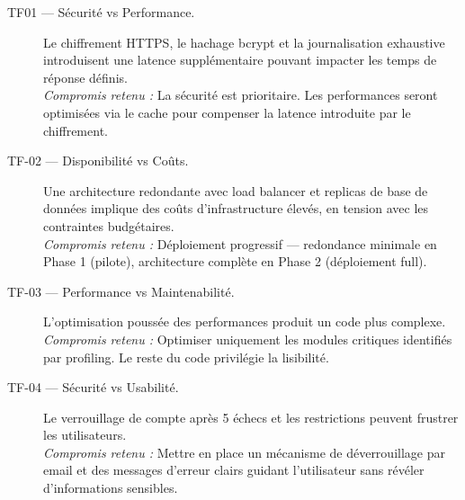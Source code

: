 \begin{description}

    \item[TF01 — Sécurité vs Performance.]
    Le chiffrement HTTPS, le hachage bcrypt et la journalisation exhaustive
    introduisent une latence supplémentaire pouvant impacter les temps de
    réponse définis.\\
    \textit{Compromis retenu :} La sécurité est prioritaire. Les performances
    seront optimisées via le cache pour compenser la latence
    introduite par le chiffrement.

    \item[TF-02 — Disponibilité vs Coûts.]
    Une architecture redondante  avec load balancer et replicas
    de base de données implique des coûts d'infrastructure élevés, en tension
    avec les contraintes budgétaires.\\
    \textit{Compromis retenu :} Déploiement progressif — redondance minimale
    en Phase 1 (pilote), architecture complète en Phase 2 (déploiement full).

    \item[TF-03 — Performance vs Maintenabilité.]
    L'optimisation poussée des performances 
    produit un code plus complexe.\\
    \textit{Compromis retenu :} Optimiser uniquement les modules critiques
    identifiés par profiling. Le reste du code privilégie la lisibilité.


    \item[TF-04 — Sécurité vs Usabilité.]
    Le verrouillage de compte après 5 échecs  et les restrictions peuvent frustrer les utilisateurs.\\
    \textit{Compromis retenu :} Mettre en place un mécanisme de déverrouillage
    par email et des messages d'erreur clairs guidant l'utilisateur sans
    révéler d'informations sensibles.

\end{description}

\vfill
